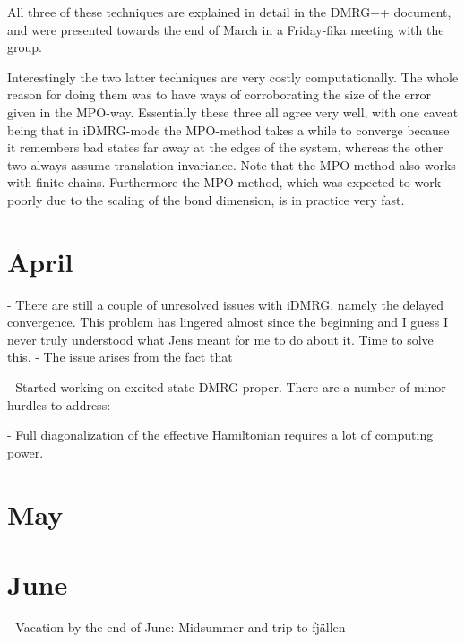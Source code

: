 \documentclass[a4paper]{article}
\begin{document}
\begin{markdown}
All three of these techniques are explained in detail in the DMRG++ document, and were presented towards the end of March in a Friday-fika meeting with the group.

Interestingly the two latter techniques are very costly computationally. The whole reason for doing them was to have ways of corroborating the size of the error given in the MPO-way. Essentially these three all agree very well, with one caveat being that in iDMRG-mode the MPO-method takes a while to converge because it remembers bad states far away at the edges of the system, whereas the other two always assume translation invariance. Note that the MPO-method also works with finite chains. Furthermore the MPO-method, which was expected to work poorly due to the scaling of the bond dimension, is in practice very fast.
	
\end{markdown}

\section*{April}
\begin{markdown}
- There are still a couple of unresolved issues with iDMRG, namely the delayed convergence. This problem has lingered almost since the beginning and I guess I never truly understood what Jens meant for me to do about it. Time to solve this.
	- The issue arises from the fact that 




- Started working on excited-state DMRG proper. There are a number of minor hurdles to address:

	- Full diagonalization of the effective Hamiltonian requires a lot of computing power. 

\end{markdown}


\section*{May}
\begin{markdown}

\end{markdown}

\section*{June}
\begin{markdown}
- Vacation by the end of June: Midsummer and trip to fjällen
\end{markdown}
\end{document}
